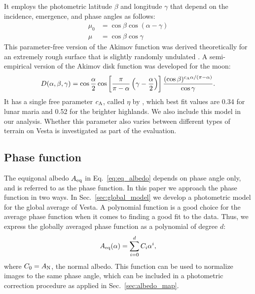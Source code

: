 \documentclass[3p,authoryear]{elsarticle}
\begin{document}
It employs the photometric latitude $\beta$ and longitude $\gamma$ that depend on the incidence, emergence, and phase angles as follows:
\begin{equation}
\begin{split}
\mu_0 & = \cos \beta \cos (\alpha - \gamma) \\
\mu & = \cos \beta \cos \gamma
\end{split}
\end{equation}
This parameter-free version of the Akimov function was derived theoretically for an extremely rough surface that is slightly randomly undulated \citep{S11}. A semi-empirical version of the Akimov disk function was developed for the moon:
\begin{equation}
D({\alpha, \beta, \gamma}) = \cos \frac{\alpha}{2} \cos \left[ \frac{\pi}{\pi - \alpha} \left( \gamma - \frac{\alpha}{2} \right) \right] \frac{(\cos \beta)^{c_{\rm A} \alpha / (\pi - \alpha)}}{\cos \gamma}.
\label{eq:Akimov_1par}
\end{equation}
It has a single free parameter $c_{\rm A}$, called $\eta$ by \citet{S11}, which best fit values are 0.34 for lunar maria and 0.52 for the brighter highlands. We also include this model in our analysis. Whether this parameter also varies between different types of terrain on Vesta is investigated as part of the evaluation.

\subsection{Phase function}

The equigonal albedo $A_{\rm eq}$ in Eq.~\ref{eq:eq_albedo} depends on phase angle only, and is referred to as the phase function. In this paper we approach the phase function in two ways. In Sec.~\ref{sec:global_model} we develop a photometric model for the global average of Vesta. A polynomial function is a good choice for the average phase function when it comes to finding a good fit to the data. Thus, we express the globally averaged phase function as a polynomial of degree $d$:
\begin{equation}
A_{\rm eq}(\alpha) = \sum\limits_{i=0}^d C_i \alpha^i,
\label{eq:poly_phase}
\end{equation}
where $C_0 = A_{\rm N}$, the normal albedo. This function can be used to normalize images to the same phase angle, which can be included in a photometric correction procedure as applied in Sec.~\ref{sec:albedo_map}.
\end{document}
